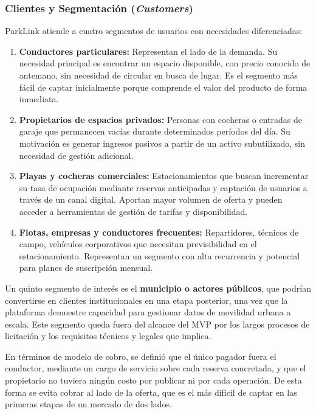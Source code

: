 \subsubsection{Clientes y Segmentación (\textit{Customers})}

ParkLink atiende a cuatro segmentos de usuarios con necesidades diferenciadas:

\begin{enumerate}
    \item \textbf{Conductores particulares:} Representan el lado de la demanda. Su necesidad principal es encontrar un espacio disponible, con precio conocido de antemano, sin necesidad de circular en busca de lugar. Es el segmento más fácil de captar inicialmente porque comprende el valor del producto de forma inmediata.

    \item \textbf{Propietarios de espacios privados:} Personas con cocheras o entradas de garaje que permanecen vacías durante determinados períodos del día. Su motivación es generar ingresos pasivos a partir de un activo subutilizado, sin necesidad de gestión adicional.

    \item \textbf{Playas y cocheras comerciales:} Estacionamientos que buscan incrementar su tasa de ocupación mediante reservas anticipadas y captación de usuarios a través de un canal digital. Aportan mayor volumen de oferta y pueden acceder a herramientas de gestión de tarifas y disponibilidad.

    \item \textbf{Flotas, empresas y conductores frecuentes:} Repartidores, técnicos de campo, vehículos corporativos que necesitan previsibilidad en el estacionamiento. Representan un segmento con alta recurrencia y potencial para planes de suscripción mensual.
\end{enumerate}

Un quinto segmento de interés es el \textbf{municipio o actores públicos}, que podrían convertirse en clientes institucionales en una etapa posterior, una vez que la plataforma demuestre capacidad para gestionar datos de movilidad urbana a escala. Este segmento queda fuera del alcance del MVP por los largos procesos de licitación y los requisitos técnicos y legales que implica.

En términos de modelo de cobro, se definió que el único pagador fuera el conductor, mediante un cargo de servicio sobre cada reserva concretada, y que el propietario no tuviera ningún costo por publicar ni por cada operación. De esta forma se evita cobrar al lado de la oferta, que es el más difícil de captar en las primeras etapas de un mercado de dos lados.


